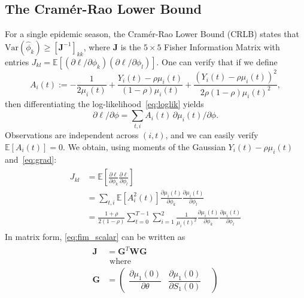 \documentclass[9pt,twocolumn,twoside]{pnas-new}
\begin{document}
{\subsection*{The Cram\'er-Rao Lower Bound}\label{subsec:crlb}
For a single epidemic season, the Cram\'er-Rao Lower Bound (CRLB)
states that $\text{Var}(\hat\phi_k) \geq [\mathbf{J}^{-1}]_{kk}$,
where $\mathbf{J}$ is the $5 \times 5$ Fisher Information Matrix with
entries $J_{kl} =
\mathbb{E}[(\partial\ell/\partial\phi_k)(\partial\ell/\partial\phi_l)]$.
One can verify that if we define
\begin{equation*}
A_i(t) := -\frac{1}{2\mu_i(t)} + \frac{Y_i(t) -
  \rho\mu_i(t)}{(1{-}\rho)\mu_i(t)} + \frac{(Y_i(t) -
  \rho\mu_i(t))^2}{2\rho(1{-}\rho)\mu_i(t)^2},
\end{equation*}
then differentiating the log-likelihood~\eqref{eq:loglik} yields
%
%
\begin{equation}\label{eq:grad}
\partial \ell / \partial \phi = \sum_{t,i} A_i(t)\,\partial
\mu_i(t)/\partial \phi.
\end{equation}
%
%
Observations are independent across $(i,t)$, and we can easily verify
$\mathbb{E}[A_i(t)] = 0$. We obtain, using moments of the Gaussian
$Y_i(t) -\rho \mu_i(t)$ and~\eqref{eq:grad}:
\begin{align}\label{eq:fim_scalar}
  \begin{split}
    J_{kl} &= \mathbb{E}\left [\frac{\partial \ell}{\partial \phi_k}\frac{\partial \ell}{\partial \phi_l}\right ] \\
    &=\sum_{t,i} \mathbb{E}[A_i^2(t)] \frac{\partial \mu_i(t)}{\partial \phi_k}  \frac{\partial \mu_i(t)}{\partial \phi_l} \\
    &= \frac{1+\rho}{2(1-\rho)}\sum_{t=0}^{T-1}\sum_{i=1}^{2}
    \frac{1}{\mu_i(t)^2} \frac{\partial \mu_i(t)}{\partial \phi_k}
    \frac{\partial \mu_i(t)}{\partial \phi_l}
  \end{split}
\end{align}
%
%
In matrix form, \eqref{eq:fim_scalar} can be written as 
\begin{align}\label{eq:fim}
  \begin{split}
  \mathbf{J} &= \mathbf{G}^T \mathbf{W} \mathbf{G} \\
  &\text{ where } \\
  \mathbf{G} &= \begin{pmatrix}
    \dfrac{\partial \mu_1(0)}{\partial \theta} &
    \dfrac{\partial \mu_1(0)}{\partial S_1(0)} &

\end{pmatrix}
\end{split}
\end{align}}
\end{document}
